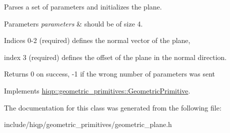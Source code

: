 Parses a set of parameters and initializes the plane. 


\begin{DoxyParams}{Parameters}
{\em parameters} & should be of size 4. \par
 Indices 0-\/2 (required) defines the normal vector of the plane, \par
 index 3 (required) defines the offset of the plane in the normal direction.\\
\hline
\end{DoxyParams}
\begin{DoxyReturn}{Returns}
0 on success, -\/1 if the wrong number of parameters was sent 
\end{DoxyReturn}


Implements \hyperlink{classhiqp_1_1geometric__primitives_1_1GeometricPrimitive_a3697e5afb0121715280da649b8bd711d}{hiqp\-::geometric\-\_\-primitives\-::\-Geometric\-Primitive}.



The documentation for this class was generated from the following file\-:\begin{DoxyCompactItemize}
\item 
include/hiqp/geometric\-\_\-primitives/geometric\-\_\-plane.\-h\end{DoxyCompactItemize}
